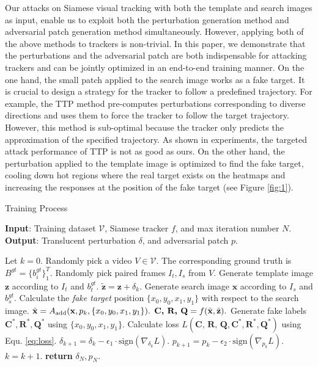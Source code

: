 \documentclass[journal]{IEEEtran}
\begin{document}
Our attacks on Siamese visual tracking with both the template and search images as input, enable us to exploit both the perturbation generation method \cite{FGSM} and adversarial patch generation method \cite{patch} simultaneously. However, applying both of the above methods to trackers is non-trivial. In this paper, we demonstrate that the perturbations and the adversarial patch are both indispensable for attacking trackers and can be jointly optimized in an end-to-end training manner. On the one hand, the small patch applied to the search image works as a fake target. It is crucial to design a strategy for the tracker to follow a predefined trajectory. For example, the TTP method \cite{TTP} pre-computes perturbations corresponding to diverse directions and uses them to force the tracker to follow the target trajectory. However, this method is sub-optimal because the tracker only predicts the approximation of the specified trajectory. As shown in experiments, the targeted attack performance of TTP is not as good as ours. On the other hand, the perturbation applied to the template image is optimized to find the fake target, cooling down hot regions where the real target exists on the heatmaps and increasing the responses at the position of the fake target (see Figure \ref{fig:1}).

\begin{algorithm}[tb]
  \caption{Training Process}
  \label{alg:algorithm}
  \textbf{Input}: Training dataset $\mathcal{V}$, Siamese tracker $f$, and max iteration number $N$.\\
  \textbf{Output}: Translucent perturbation $\delta$, and adversarial patch $p$.
  \begin{algorithmic}[1] %
  \STATE Let $k = 0$.
  \STATE Randomly pick a video $V\in \mathcal{V}$. The corresponding ground truth is $B^{gt}=\{b^{gt}_i\}^T_1$.
  \STATE Randomly pick paired frames $I_t, I_s$ from $V$.
  \STATE Generate template image $\textbf{z}$ according to $I_t$ and $b^{gt}_t$.
  \STATE $\tilde{\textbf{z}} = \textbf{z} + \delta_k.$
  \STATE Generate search image $\textbf{x}$ according to $I_s$ and $b^{gt}_s$.
  \STATE Calculate the \textit{fake target} position $\{x_0, y_0, x_1, y_1\}$ with respect to the search image.
  \STATE $\tilde{\textbf x} = A_{\text{add}}(\textbf x, p_k, \{x_0, y_0, x_1, y_1\}).$
  \STATE $\textbf{C, R, Q} = f(\tilde {\textbf x}, \tilde{\textbf z}).$
  \STATE Generate fake labels $\textbf{C}^*,\textbf{R}^*,\textbf{Q}^*$ using $\{x_0, y_0, x_1, y_1\}$.
  \STATE Calculate loss $L(\textbf{C, R, Q}, \textbf{C}^*, \textbf{R}^*, \textbf{Q}^*)$ using Equ. \ref{eq:loss}.
  \STATE $\delta_{k+1} = \delta_{k} - \epsilon_1 \cdot \text{sign}(\nabla_{\delta_k}L).$
  \STATE $p_{k+1} = p_{k} - \epsilon_2 \cdot \text{sign}(\nabla_{p_k}L).$
  \STATE $k = k + 1.$
  \ENDWHILE
  \STATE \textbf{return} $\delta_N, p_N.$
  \end{algorithmic}
  \label{alg}
\end{algorithm}
\end{document}
